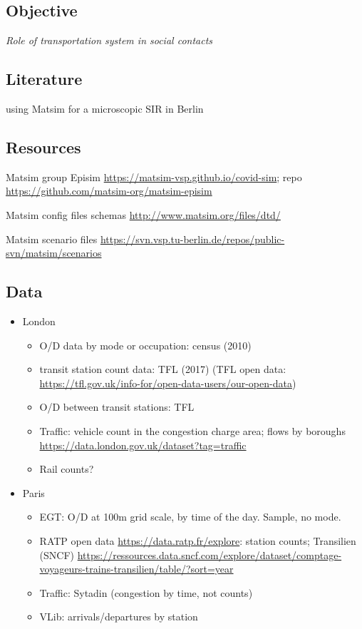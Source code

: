 \documentclass[10pt]{article}
\begin{document}
\subsection{Objective}

\textit{Role of transportation system in social contacts}

\subsection{Literature}

\cite{11303_10945} using Matsim for a microscopic SIR in Berlin

\subsection{Resources}

Matsim group Episim \url{https://matsim-vsp.github.io/covid-sim}; repo \url{https://github.com/matsim-org/matsim-episim}

Matsim config files schemas \url{http://www.matsim.org/files/dtd/}

Matsim scenario files \url{https://svn.vsp.tu-berlin.de/repos/public-svn/matsim/scenarios}
	
\subsection{Data}

\begin{itemize}
	\item London
	\begin{itemize}
		\item O/D data by mode or occupation: census (2010)
		\item transit station count data: TFL (2017) (TFL open data: \url{https://tfl.gov.uk/info-for/open-data-users/our-open-data})
		\item O/D between transit stations: TFL
		\item Traffic: vehicle count in the congestion charge area; flows by boroughs \url{https://data.london.gov.uk/dataset?tag=traffic}
		\item Rail counts?
	\end{itemize}
	\item Paris
	\begin{itemize}
		\item EGT: O/D at 100m grid scale, by time of the day. Sample, no mode.
		\item RATP open data \url{https://data.ratp.fr/explore}: station counts; Transilien (SNCF) \url{https://ressources.data.sncf.com/explore/dataset/comptage-voyageurs-trains-transilien/table/?sort=year}
		\item Traffic: Sytadin (congestion by time, not counts)
		\item VLib: arrivals/departures by station
	\end{itemize}
\end{itemize}
\end{document}
